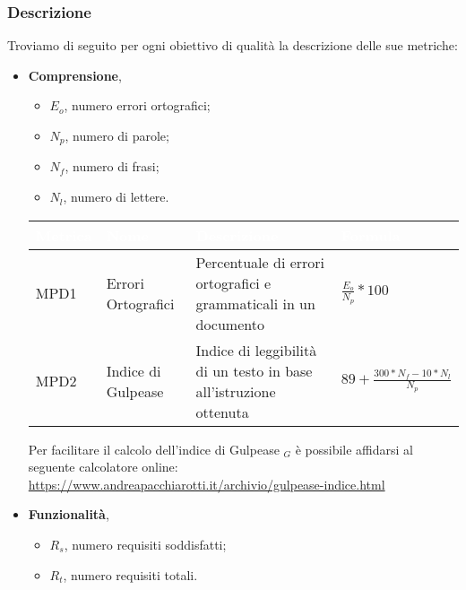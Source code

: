    \subsubsection{Descrizione}
   Troviamo di seguito per ogni obiettivo di qualità la descrizione delle sue metriche:
    \begin{itemize}
        \item \textbf{Comprensione},
            \begin{itemize}
                \item $E_o$, numero errori ortografici;
                \item $N_p$, numero di parole;
                \item $N_f$, numero di frasi;
                \item $N_l$, numero di lettere.
            \end{itemize}
            \renewcommand\arraystretch{1,5}
            \begin{center}
                \begin{tabular}{|p{1.7cm}|p{3cm}|p{4.5cm}|p{3cm}|} \hline
                  \rowcolor[HTML]{036400}
                  \textcolor[HTML]{FFFFFF}{\textbf{Metrica}} & \textcolor[HTML]{FFFFFF}{\textbf{Nome}} & \textcolor[HTML]{FFFFFF}{\textbf{Descrizione}} & \textcolor[HTML]{FFFFFF}{\textbf{Formula}}    \\ \hline
                    \rowcolor[HTML]{EFEFEF}
                    MPD1 & Errori Ortografici    & Percentuale di errori ortografici e grammaticali in un documento      & $\frac{E_o}{N_p}*100$        \\ \hline
                    \rowcolor[HTML]{C0C0C0}
                    MPD2 & Indice di Gulpease    & Indice di leggibilità di un testo in base all'istruzione ottenuta   & $89+\frac{300*N_f-10*N_l}{N_p}$     \\ \hline
                \end{tabular}
            \end{center}
            \renewcommand\arraystretch{1}
            Per facilitare il calcolo dell'indice di Gulpease $_G$ è possibile affidarsi al seguente calcolatore online:\\
            \url{https://www.andreapacchiarotti.it/archivio/gulpease-indice.html}
        \item \textbf{Funzionalità},
            \begin{itemize}
                \item $R_s$, numero requisiti soddisfatti;
                \item $R_t$, numero requisiti totali.

\end{itemize}
\end{itemize}
